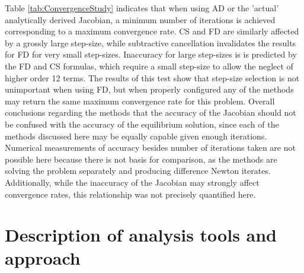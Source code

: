 \documentclass[preprint,12pt]{elsarticle}
\begin{document}
Table \ref{tab:ConvergenceStudy} indicates that when using AD or the 'actual'
analytically derived Jacobian, a minimum number of iterations is achieved
corresponding to a maximum convergence rate. CS and FD are similarly affected
by a grossly large step-size, while subtractive cancellation invalidates the
results for FD for very small step-sizes. Inaccuracy for large step-sizes is is
predicted by the FD and CS formulas, which require a small
step-size to allow the neglect of higher order 12 terms. The results of this
test show that step-size selection is not unimportant when using FD, but when
properly configured any of the methods may return the same maximum convergence
rate for this problem.  Overall conclusions regarding the methods that the accuracy of the
Jacobian should not be confused with the accuracy of the equilibrium
solution, since each of the methods discussed here may be equally capable given
enough iterations. Numerical measurements of accuracy besides number of iterations taken
are not possible here because there is not basis for comparison, as the methods are solving
the problem separately and producing difference Newton iterates. Additionally, while the inaccuracy of the Jacobian may
strongly affect convergence rates, this relationship was not precisely quantified here.


\section{Description of analysis tools and approach} 
%
\end{document}
